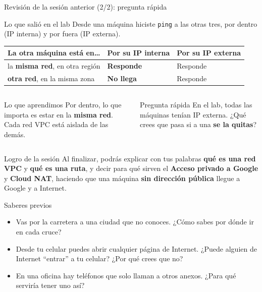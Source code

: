 \documentclass[aspectratio=169,10pt,c]{beamer}
\begin{document}
\begin{frame}{Revisión de la sesión anterior (2/2): pregunta rápida}
\begin{block}{Lo que salió en el lab}
\small Desde una máquina hiciste \texttt{ping} a las otras tres, por dentro (IP interna) y por fuera (IP externa).
\end{block}
\renewcommand{\arraystretch}{1.3}
\centering\small
\begin{tabular}{@{}p{5.2cm}p{3.4cm}p{3.4cm}@{}}
\toprule
\textbf{La otra máquina está en\ldots} & \textbf{Por su IP interna} & \textbf{Por su IP externa}\\
\midrule
la \textbf{misma red}, en otra región & \textbf{Responde} & Responde\\
\textbf{otra red}, en la misma zona & \textbf{No llega} & Responde\\
\bottomrule
\end{tabular}
\par\vspace{3mm}
\begin{columns}[T,onlytextwidth]
\begin{exampleblock}{Lo que aprendimos}
\small Por dentro, lo que importa es estar en la \textbf{misma red}. Cada red VPC está aislada de las demás.
\end{exampleblock}
\begin{alertblock}{Pregunta rápida}
\small En el lab, todas las máquinas tenían IP externa. ¿Qué crees que pasa si a una \textbf{se la quitas}?
\end{alertblock}
\end{columns}
\end{frame}

\begin{frame}[c]
\begin{block}{Logro de la sesión}
Al finalizar, podrás explicar con tus palabras \textbf{qué es una red VPC} y \textbf{qué es una ruta}, y decir para qué sirven el \textbf{Acceso privado a Google} y \textbf{Cloud NAT}, haciendo que una máquina \textbf{sin dirección pública} llegue a Google y a Internet.
\end{block}
\end{frame}

\begin{frame}{Saberes previos}
\begin{itemize}\setlength\itemsep{10pt}
  \item Vas por la carretera a una ciudad que no conoces. ¿Cómo sabes por dónde ir en cada cruce?
  \item Desde tu celular puedes abrir cualquier página de Internet. ¿Puede alguien de Internet ``entrar'' a tu celular? ¿Por qué crees que no?
  \item En una oficina hay teléfonos que solo llaman a otros anexos. ¿Para qué serviría tener uno así?
\end{itemize}
\end{frame}
\end{document}
